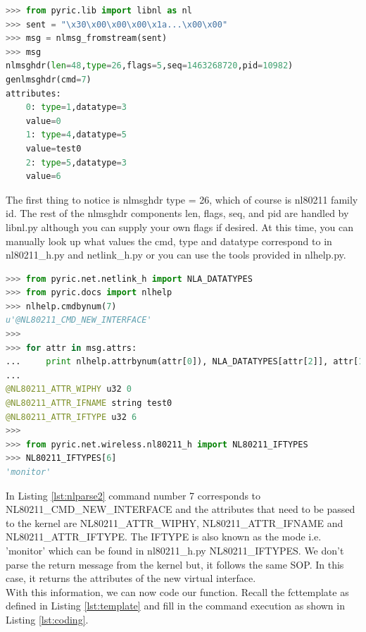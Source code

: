 \documentclass[11pt]{article}
\begin{document}
\begin{lstlisting}[caption={Parsing netlink messages},
                   label={lst:nlparse},
                   language=Python]
>>> from pyric.lib import libnl as nl
>>> sent = "\x30\x00\x00\x00\x1a...\x00\x00"
>>> msg = nlmsg_fromstream(sent)
>>> msg
nlmsghdr(len=48,type=26,flags=5,seq=1463268720,pid=10982)
genlmsghdr(cmd=7)
attributes:
	0: type=1,datatype=3
	value=0
	1: type=4,datatype=5
	value=test0
	2: type=5,datatype=3
	value=6
\end{lstlisting}

The first thing to notice is nlmsghdr type = 26, which of course is nl80211 family
id. The rest of the nlmsghdr components len, flags, seq, and pid are handled by
libnl.py although you can supply your own flags if desired. At this time, you can
manually look up what values the cmd, type and datatype correspond to in 
nl80211\_h.py and netlink\_h.py or you can use the tools provided in nlhelp.py.\\

\begin{lstlisting}[caption={Parsing netlink messages continued},
                   label={lst:nlparse2},
                   language=Python]
>>> from pyric.net.netlink_h import NLA_DATATYPES
>>> from pyric.docs import nlhelp
>>> nlhelp.cmdbynum(7)
u'@NL80211_CMD_NEW_INTERFACE'
>>>
>>> for attr in msg.attrs:
...     print nlhelp.attrbynum(attr[0]), NLA_DATATYPES[attr[2]], attr[1]
... 
@NL80211_ATTR_WIPHY u32 0
@NL80211_ATTR_IFNAME string test0
@NL80211_ATTR_IFTYPE u32 6
>>>
>>> from pyric.net.wireless.nl80211_h import NL80211_IFTYPES
>>> NL80211_IFTYPES[6]
'monitor'
\end{lstlisting}

In Listing \ref{lst:nlparse2} command number 7 corresponds to 
NL80211\_CMD\_NEW\_INTERFACE and the attributes that need to be passed to the
kernel are NL80211\_ATTR\_WIPHY, NL80211\_ATTR\_IFNAME and NL80211\_ATTR\_IFTYPE.
The IFTYPE is also known as the mode i.e. 'monitor' which can be found in
nl80211\_h.py NL80211\_IFTYPES. We don't parse the return message from the kernel
but, it follows the same SOP. In this case, it returns the attributes of the new
virtual interface. \\

With this information, we can now code our function. Recall the fcttemplate as
defined in Listing \ref{lst:template} and fill in the command execution as shown 
in Listing \ref{lst:coding}. \\
\end{document}
